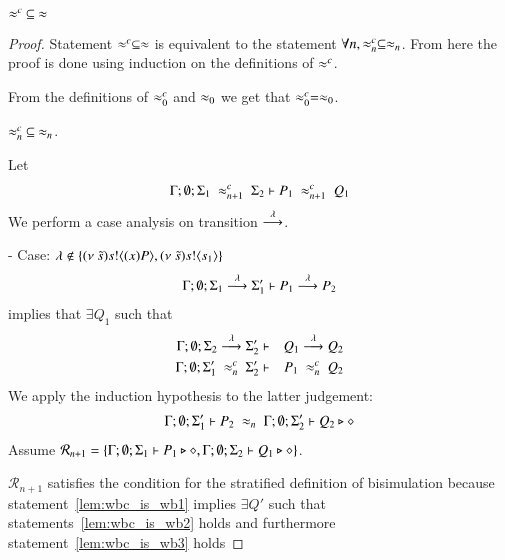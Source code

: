 

\begin{lemma}\rm
	\label{lem:wbc_is_wb}
	$\approx^{c}\ \subseteq\ \approx$
\end{lemma}

\begin{proof}
	Statement $\approx^{c} \subseteq \approx$
	is equivalent to the statement $\forall n, \approx^{c}_n \subseteq \approx_n$.
	From here the proof is done using induction on the definitions of $\approx^{c}$.

	From the definitions of $\approx^{c}_0$ and $\approx_0$ we get that $\approx^{c}_0 = \approx_0$.

	$\approx^{c}_n\ \subseteq\ \approx_n$.

	Let
%
	\begin{eqnarray*}
		\Gamma; \emptyset; \Sigma_1\ \wbc_{n+1}\ \Sigma_2 \proves P_1\ \wbc_{n+1}\ Q_1
	\end{eqnarray*}
%
	\noi We perform a case analysis on transition $\stackrel{\lambda}{\longrightarrow}$.


	\noi - Case: $\lambda \notin \{(\nu\ \tilde{s}) s ! \langle (x)P \rangle, (\nu\ \tilde{s}) s ! \langle s_1 \rangle\}$
%
	\begin{eqnarray}
		\Gamma; \emptyset; \Sigma_1 \stackrel{\lambda}{\longrightarrow} \Sigma_1' \vdash P_1 \stackrel{\lambda}{\longrightarrow} P_2 \label{lem:wbc_is_wb1}
	\end{eqnarray}
%
	\noi implies that 
	$\exists Q_1$ such that
%
	\begin{eqnarray}
		\Gamma; \emptyset; \Sigma_2 \stackrel{\lambda}{\longrightarrow} \Sigma_2' &\vdash& Q_1 \stackrel{\lambda}{\longrightarrow} Q_2 \label{lem:wbc_is_wb2}\\
		\Gamma; \emptyset; \Sigma_1'\ \approx^{c}_n\ \Sigma_2' &\vdash& P_1\ \approx^{c}_n\ Q_2
	\end{eqnarray}
%
	We apply the induction hypothesis to the latter judgement:
%
	\begin{eqnarray}
		\Gamma; \emptyset; \Sigma_1' \vdash P_2\ \approx_n\ \Gamma; \emptyset; \Sigma_2' \vdash Q_2 \triangleright \diamond  \label{lem:wbc_is_wb3}
	\end{eqnarray}
%
	Assume $\mathcal{R}_{n+1} = \{\Gamma; \emptyset; \Sigma_1 \vdash P_1 \triangleright \diamond, \Gamma; \emptyset; \Sigma_2 \vdash Q_1 \triangleright \diamond\}$.

	\noi $\mathcal{R}_{n+1}$ satisfies the condition for the stratified definition of bisimulation
	because statement~\ref{lem:wbc_is_wb1} implies $\exists Q'$ such that
	statements~\ref{lem:wbc_is_wb2} holds and furthermore statement~\ref{lem:wbc_is_wb3} holds


\end{proof}
